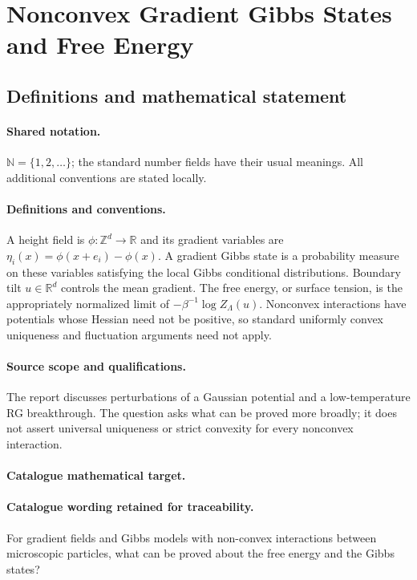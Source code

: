 \documentclass[11pt]{article}
\begin{document}
\section{Nonconvex Gradient Gibbs States and Free Energy}\label{statement}

\subsection{Definitions and mathematical statement}

\paragraph{Shared notation.}$\mathbb N=\{1,2,\ldots\}$; the standard number fields have their usual meanings. All additional conventions are stated locally.


\paragraph{Definitions and conventions.} A height field is $\phi:\mathbb Z^d\to\mathbb R$ and its gradient variables are $\eta_i(x)=\phi(x+e_i)-\phi(x)$. A gradient Gibbs state is a probability measure on these variables satisfying the local Gibbs conditional distributions. Boundary tilt $u\in\mathbb R^d$ controls the mean gradient. The free energy, or surface tension, is the appropriately normalized limit of $-\beta^{-1}\log Z_\Lambda(u)$. Nonconvex interactions have potentials whose Hessian need not be positive, so standard uniformly convex uniqueness and fluctuation arguments need not apply.

\paragraph{Source scope and qualifications.} The report discusses perturbations of a Gaussian potential and a low-temperature RG breakthrough. The question asks what can be proved more broadly; it does not assert universal uniqueness or strict convexity for every nonconvex interaction.

\paragraph{Catalogue mathematical target.}
\paragraph{Catalogue wording retained for traceability.}
For gradient fields and Gibbs models with non-convex interactions between microscopic particles, what can be proved about the free energy and the Gibbs states?
\end{document}
